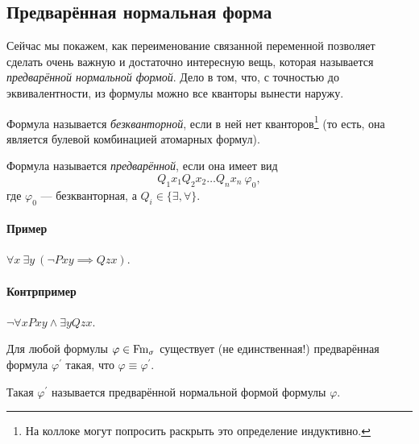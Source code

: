 \subsection{Предварённая нормальная форма}

Сейчас мы покажем, как переименование связанной переменной позволяет сделать очень важную и достаточно интересную вещь, которая называется {\it предварённой нормальной формой}.
Дело в том, что, с точностью до эквивалентности, из формулы можно все кванторы вынести наружу.

\begin{definition}
    Формула называется {\it безкванторной}, если в ней нет кванторов\footnote{На коллоке могут попросить раскрыть это определение индуктивно.} (то есть, она является булевой комбинацией атомарных формул).
\end{definition}

\begin{definition}
    Формула называется {\it предварённой}, если она имеет вид
    $$
        Q_{1}x_{1} Q_{2}x_{2} \ldots Q_{n}x_{n}~\varphi_{0},
    $$
    где $\varphi_{0}$ --- безкванторная, а $Q_{i} \in \{\exists, \forall\}$.
\end{definition}

\paragraph{Пример}
$\forall x~\exists y~(\neg Pxy \implies Qzx)$.

\paragraph{Контрпример}
$\neg \forall x Pxy \land \exists y Qzx$.

\begin{theorem}
    Для любой формулы $\varphi \in \mathrm{Fm}_{\sigma}$ существует (не единственная!) предварённая формула $\varphi^{\prime}$ такая, что $\varphi \equiv \varphi^{\prime}$.
\end{theorem}

Такая $\varphi^{\prime}$ называется предварённой нормальной формой формулы $\varphi$.

